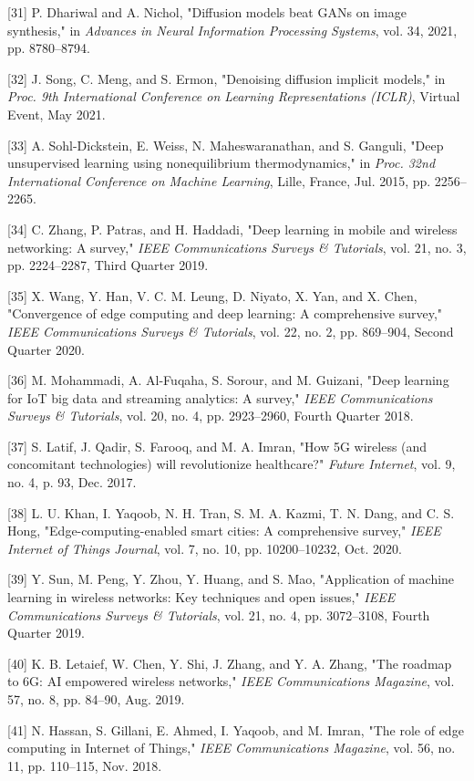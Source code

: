 \documentclass[conference]{IEEEtran}
\begin{document}
[31] P. Dhariwal and A. Nichol, "Diffusion models beat GANs on image synthesis," in \textit{Advances in Neural Information Processing Systems}, vol. 34, 2021, pp. 8780--8794.

[32] J. Song, C. Meng, and S. Ermon, "Denoising diffusion implicit models," in \textit{Proc. 9th International Conference on Learning Representations (ICLR)}, Virtual Event, May 2021.

[33] A. Sohl-Dickstein, E. Weiss, N. Maheswaranathan, and S. Ganguli, "Deep unsupervised learning using nonequilibrium thermodynamics," in \textit{Proc. 32nd International Conference on Machine Learning}, Lille, France, Jul. 2015, pp. 2256--2265.

[34] C. Zhang, P. Patras, and H. Haddadi, "Deep learning in mobile and wireless networking: A survey," \textit{IEEE Communications Surveys \& Tutorials}, vol. 21, no. 3, pp. 2224--2287, Third Quarter 2019.

[35] X. Wang, Y. Han, V. C. M. Leung, D. Niyato, X. Yan, and X. Chen, "Convergence of edge computing and deep learning: A comprehensive survey," \textit{IEEE Communications Surveys \& Tutorials}, vol. 22, no. 2, pp. 869--904, Second Quarter 2020.

[36] M. Mohammadi, A. Al-Fuqaha, S. Sorour, and M. Guizani, "Deep learning for IoT big data and streaming analytics: A survey," \textit{IEEE Communications Surveys \& Tutorials}, vol. 20, no. 4, pp. 2923--2960, Fourth Quarter 2018.

[37] S. Latif, J. Qadir, S. Farooq, and M. A. Imran, "How 5G wireless (and concomitant technologies) will revolutionize healthcare?" \textit{Future Internet}, vol. 9, no. 4, p. 93, Dec. 2017.

[38] L. U. Khan, I. Yaqoob, N. H. Tran, S. M. A. Kazmi, T. N. Dang, and C. S. Hong, "Edge-computing-enabled smart cities: A comprehensive survey," \textit{IEEE Internet of Things Journal}, vol. 7, no. 10, pp. 10200--10232, Oct. 2020.

[39] Y. Sun, M. Peng, Y. Zhou, Y. Huang, and S. Mao, "Application of machine learning in wireless networks: Key techniques and open issues," \textit{IEEE Communications Surveys \& Tutorials}, vol. 21, no. 4, pp. 3072--3108, Fourth Quarter 2019.

[40] K. B. Letaief, W. Chen, Y. Shi, J. Zhang, and Y. A. Zhang, "The roadmap to 6G: AI empowered wireless networks," \textit{IEEE Communications Magazine}, vol. 57, no. 8, pp. 84--90, Aug. 2019.

[41] N. Hassan, S. Gillani, E. Ahmed, I. Yaqoob, and M. Imran, "The role of edge computing in Internet of Things," \textit{IEEE Communications Magazine}, vol. 56, no. 11, pp. 110--115, Nov. 2018.
\end{document}
